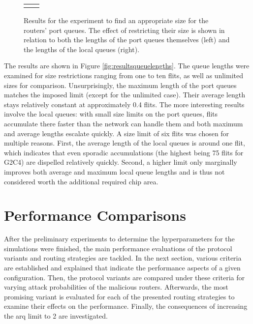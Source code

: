 \begin{figure}
    \centering
    \begin{tabular}{cc}
         & 
    \end{tabular}
    \caption[Results for router queue lengths experiment]{Results for the experiment to find an appropriate size for the routers' port queues. The
    effect of restricting their size is shown in relation to both the lengths of the port queues themselves (left) and the lengths of the local queues
    (right).}
    \label{fig:resultsqueuelengths}
\end{figure}

The results are shown in Figure \vref{fig:resultsqueuelengths}. The queue lengths were examined for size restrictions ranging from one to ten flits,
as well as unlimited sizes for comparison. Unsurprisingly, the maximum length of the port queues matches the imposed limit (except for the unlimited
case). Their average length stays relatively constant at approximately 0.4 flits. The more interesting results involve the local queues: with small
size limits on the port queues, flits accumulate there faster than the network can handle them and both maximum and average lengths escalate quickly.
A size limit of six flits was chosen for multiple reasons. First, the average length of the local queues is around one flit, which indicates that even
sporadic accumulations (the highest being 75 flits for G2C4) are dispelled relatively quickly. Second, a higher limit only marginally improves both
average and maximum local queue lengths and is thus not considered worth the additional required chip area.

\section{Performance Comparisons}\label{sec:perfcompeval}
After the preliminary experiments to determine the hyperparameters for the simulations were finished, the main performance evaluations of the protocol
variants and routing strategies are tackled. In the next section, various criteria are established and explained that indicate the performance aspects
of a given configuration. Then, the protocol variants are compared under these criteria for varying attack probabilities of the malicious routers.
Afterwards, the most promising variant is evaluated for each of the presented routing strategies to examine their effects on the performance. Finally,
the consequences of increasing the \gls{arq} limit to 2 are investigated.

